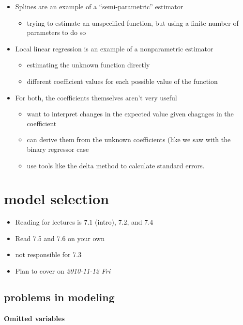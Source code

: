 \begin{itemize}
\item Splines are an example of a ``semi-parametric'' estimator
\begin{itemize}
\item trying to estimate an unspecified function, but using a
          finite number of parameters to do so
\end{itemize}
\item Local linear regression is an example of a nonparametric estimator
\begin{itemize}
\item estimating the unknown function directly
\item different coefficient values for each possible value of the
          function
\end{itemize}
\item For both, the coefficients themselves aren't very useful
\begin{itemize}
\item want to interpret changes in the expected value given
          chagnges in the coefficient
\item can derive them from the unknown coefficients (like we saw
          with the binary regressor case
\item use tools like the delta method to calculate standard errors.
\end{itemize}
\end{itemize}
\section{model selection}
\label{sec-2}

\begin{itemize}
\item Reading for lectures is 7.1 (intro), 7.2, and 7.4
\item Read 7.5 and 7.6 on your own
\item not responsible for 7.3
\item Plan to cover on \textit{2010-11-12 Fri}
\end{itemize}
\subsection{problems in modeling}
\label{sec-2-1}
\paragraph{Omitted variables}
\label{sec-2-1-1}

